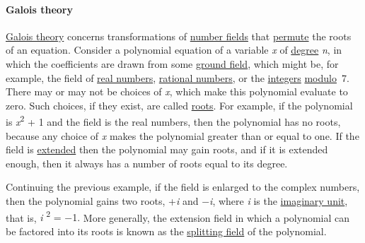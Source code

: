\paragraph{Galois theory}\label{Galois_theory}

\href{https://en.wikipedia.org/wiki/Galois_theory}{Galois theory} concerns transformations of \href{https://en.wikipedia.org/wiki/Field_(mathematics)}{number fields} that \href{https://en.wikipedia.org/wiki/Permute}{permute} the roots of an equation. Consider a polynomial equation of a variable {\emph{x}} of \href{https://en.wikipedia.org/wiki/Degree_of_a_polynomial}{degree} {\emph{n}}, in which the coefficients are drawn from some \href{https://en.wikipedia.org/wiki/Ground_field}{ground field}, which might be, for example, the field of \href{https://en.wikipedia.org/wiki/Real_number}{real numbers}, \href{https://en.wikipedia.org/wiki/Rational_number}{rational numbers}, or the \href{https://en.wikipedia.org/wiki/Integer}{integers} \href{https://en.wikipedia.org/wiki/Modular_arithmetic}{modulo}{~}7. There may or may not be choices of {\emph{x}}, which make this polynomial evaluate to zero. Such choices, if they exist, are called \href{https://en.wikipedia.org/wiki/Root_of_a_function}{roots}. For example, if the polynomial is {\emph{x}\textsuperscript{2} + 1} and the field is the real numbers, then the polynomial has no roots, because any choice of {\emph{x}} makes the polynomial greater than or equal to one. If the field is \href{https://en.wikipedia.org/wiki/Field_extension}{extended} then the polynomial may gain roots, and if it is extended enough, then it always has a number of roots equal to its degree.

Continuing the previous example, if the field is enlarged to the complex numbers, then the polynomial gains two roots, {+\emph{i}} and {−\emph{i}}, where {\emph{i}} is the \href{https://en.wikipedia.org/wiki/Imaginary_unit}{imaginary unit}, that is, {\emph{i} \textsuperscript{2} = −1.} More generally, the extension field in which a polynomial can be factored into its roots is known as the \href{https://en.wikipedia.org/wiki/Splitting_field}{splitting field} of the polynomial.

